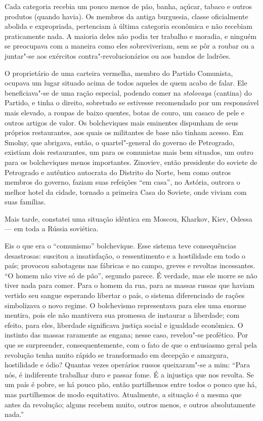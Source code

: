 Cada categoria recebia um pouco menos de pão, banha, açúcar, tabaco e
outros produtos (quando havia). Os membros da antiga burguesia, classe
oficialmente abolida e expropriada, pertenciam à última categoria
econômica e não recebiam praticamente nada. A maioria deles não podia
ter trabalho e moradia, e ninguém se preocupava com a maneira como eles
sobreviveriam, sem se pôr a roubar ou a juntar"-se aos exércitos
contra"-revolucionários ou aos bandos de ladrões.

O proprietário de uma carteira vermelha, membro do Partido Comunista,
ocupava um lugar situado acima de todos aqueles de quem acabo de falar.
Ele beneficiava"-se de uma ração especial, podendo comer na \textit{stolovaya} 
(cantina) do Partido, e tinha o direito, sobretudo se estivesse
recomendado por um responsável mais elevado, a roupas de baixo quentes,
botas de couro, um casaco de pele e outros artigos de valor. Os
bolcheviques mais eminentes dispunham de seus próprios restaurantes,
aos quais os militantes de base não tinham acesso. Em Smolny, que
abrigava, então, o quartel"-general do governo de Petrogrado, existiam
dois restaurantes, um para os comunistas mais bem situados, um outro
para os bolcheviques menos importantes. Zinoviev, então presidente do
soviete de Petrogrado e autêntico autocrata do Distrito do Norte, bem
como outros membros do governo, faziam suas refeições “em casa”, no
Astória, outrora o melhor hotel da cidade, tornado a primeira Casa do
Soviete, onde viviam com suas famílias.

Mais tarde, constatei uma situação idêntica em Moscou, Kharkov, Kiev,
Odessa --- em toda a Rússia soviética.

Eis o que era o “comunismo” bolchevique. Esse sistema teve consequências
desastrosas: suscitou a insatisfação, o ressentimento e a hostilidade
em todo o país; provocou sabotagens nas fábricas e no campo, greves e
revoltas incessantes. “O homem não vive só de pão”, segundo parece. É
verdade, mas ele morre se não tiver nada para comer. Para o homem da
rua, para as massas russas que haviam vertido seu sangue esperando
libertar o país, o sistema diferenciado de rações simbolizava o novo
regime. O bolchevismo representava para eles uma enorme mentira, pois
ele não mantivera sua promessa de instaurar a liberdade; com efeito,
para eles, liberdade significava justiça social e igualdade
econômica. O instinto das massas raramente as engana; nesse caso,
revelou"-se profético. Por que se surpreender, consequentemente, com o
fato de que o entusiasmo geral pela revolução tenha muito rápido se
transformado em decepção e amargura, hostilidade e ódio? Quantas vezes
operários russos queixaram"-se a mim: “Para nós, é indiferente trabalhar
duro e passar fome. É a injustiça que nos revolta. Se um país é pobre,
se há pouco pão, então partilhemos entre todos o pouco que há, mas
partilhemos de modo equitativo. Atualmente, a situação é a mesma que
antes da revolução; alguns recebem muito, outros menos, e outros
absolutamente nada.''

